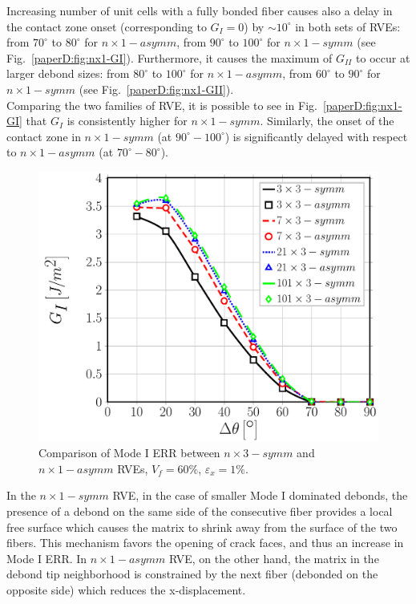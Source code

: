Increasing number of unit cells with a fully bonded fiber causes also a delay in the contact zone onset (corresponding to $G_{I}=0$) by $\sim10^{\circ}$  in both sets of RVEs: from $70^{\circ}$ to $80^{\circ}$ for $n \times 1-asymm$, from $90^{\circ}$ to $100^{\circ}$ for $n \times 1-symm$ (see Fig.~\ref{paperD:fig:nx1-GI}). Furthermore, it causes the maximum of $G_{II}$ to occur at larger debond sizes: from $80^{\circ}$ to $100^{\circ}$ for $n \times 1-asymm$, from $60^{\circ}$ to $90^{\circ}$ for $n \times 1-symm$ (see Fig.~\ref{paperD:fig:nx1-GII}).\\
Comparing the two families of RVE, it is possible to see in Fig.~\ref{paperD:fig:nx1-GI} that $G_{I}$ is consistently higher for $n \times 1-symm$. Similarly, the onset of the contact zone in $n \times 1-symm$ (at $90^{\circ}-100^{\circ}$) is significantly delayed with respect to $n \times 1 - asymm$ (at $70^{\circ}- 80^{\circ}$). 

\begin{figure}[!htb]
\centering
  \includegraphics[width=\textwidth]{paperD/nxk-coupling-vf60-GI.pdf}
\caption{Comparison of Mode I ERR between $n \times 3-symm$ and $n \times 1-asymm$ RVEs, $V_{f}=60\%$, $\varepsilon_{x}=1\%$.}\label{paperD:fig:nxk-GI}
\end{figure}

In the $n \times 1-symm$ RVE, in the case of smaller Mode I dominated debonds, the presence of a debond on the same side of the consecutive fiber provides a local free surface which causes the matrix to shrink away from the surface of the two fibers.  This mechanism favors the opening of crack faces, and thus an increase in Mode I ERR. In $n \times 1-asymm$ RVE, on the other hand, the matrix in the debond tip neighborhood is constrained by the next fiber (debonded on the opposite side) which reduces the x-displacement.


